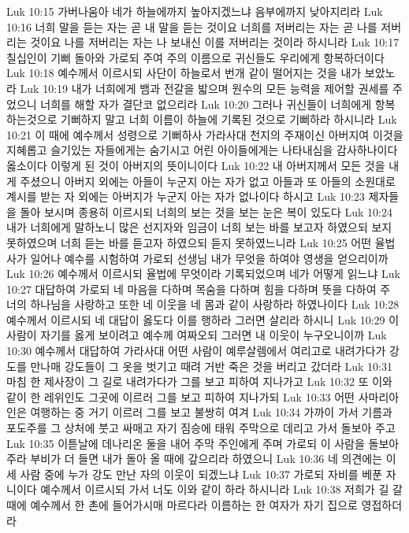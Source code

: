 Luk 10:15  가버나움아 네가 하늘에까지 높아지겠느냐 음부에까지 낮아지리라
Luk 10:16  너희 말을 듣는 자는 곧 내 말을 듣는 것이요 너희를 저버리는 자는 곧 나를 저버리는 것이요 나를 저버리는 자는 나 보내신 이를 저버리는 것이라 하시니라
Luk 10:17  칠십인이 기뻐 돌아와 가로되 주여 주의 이름으로 귀신들도 우리에게 항복하더이다
Luk 10:18  예수께서 이르시되 사단이 하늘로서 번개 같이 떨어지는 것을 내가 보았노라
Luk 10:19  내가 너희에게 뱀과 전갈을 밟으며 원수의 모든 능력을 제어할 권세를 주었으니 너희를 해할 자가 결단코 없으리라
Luk 10:20  그러나 귀신들이 너희에게 항복하는것으로 기뻐하지 말고 너희 이름이 하늘에 기록된 것으로 기뻐하라 하시니라
Luk 10:21  이 때에 예수께서 성령으로 기뻐하사 가라사대 천지의 주재이신 아버지여 이것을 지혜롭고 슬기있는 자들에게는 숨기시고 어린 아이들에게는 나타내심을 감사하나이다 옳소이다 이렇게 된 것이 아버지의 뜻이니이다
Luk 10:22  내 아버지께서 모든 것을 내게 주셨으니 아버지 외에는 아들이 누군지 아는 자가 없고 아들과 또 아들의 소원대로 계시를 받는 자 외에는 아버지가 누군지 아는 자가 없나이다 하시고
Luk 10:23  제자들을 돌아 보시며 종용히 이르시되 너희의 보는 것을 보는 눈은 복이 있도다
Luk 10:24  내가 너희에게 말하노니 많은 선지자와 임금이 너희 보는 바를 보고자 하였으되 보지 못하였으며 너희 듣는 바를 듣고자 하였으되 듣지 못하였느니라
Luk 10:25  어떤 율법사가 일어나 예수를 시험하여 가로되 선생님 내가 무엇을 하여야 영생을 얻으리이까
Luk 10:26  예수께서 이르시되 율법에 무엇이라 기록되었으며 네가 어떻게 읽느냐
Luk 10:27  대답하여 가로되 네 마음을 다하며 목숨을 다하며 힘을 다하며 뜻을 다하여 주 너의 하나님을 사랑하고 또한 네 이웃을 네 몸과 같이 사랑하라 하였나이다
Luk 10:28  예수께서 이르시되 네 대답이 옳도다 이를 행하라 그러면 살리라 하시니
Luk 10:29  이 사람이 자기를 옳게 보이려고 예수께 여짜오되 그러면 내 이웃이 누구오니이까
Luk 10:30  예수께서 대답하여 가라사대 어떤 사람이 예루살렘에서 여리고로 내려가다가 강도를 만나매 강도들이 그 옷을 벗기고 때려 거반 죽은 것을 버리고 갔더라
Luk 10:31  마침 한 제사장이 그 길로 내려가다가 그를 보고 피하여 지나가고
Luk 10:32  또 이와 같이 한 레위인도 그곳에 이르러 그를 보고 피하여 지나가되
Luk 10:33  어떤 사마리아인은 여행하는 중 거기 이르러 그를 보고 불쌍히 여겨
Luk 10:34  가까이 가서 기름과 포도주를 그 상처에 붓고 싸매고 자기 짐승에 태워 주막으로 데리고 가서 돌보아 주고
Luk 10:35  이튿날에 데나리온 둘을 내어 주막 주인에게 주며 가로되 이 사람을 돌보아 주라 부비가 더 들면 내가 돌아 올 때에 갚으리라 하였으니
Luk 10:36  네 의견에는 이 세 사람 중에 누가 강도 만난 자의 이웃이 되겠느냐
Luk 10:37  가로되 자비를 베푼 자니이다 예수께서 이르시되 가서 너도 이와 같이 하라 하시니라
Luk 10:38  저희가 길 갈 때에 예수께서 한 촌에 들어가시매 마르다라 이름하는 한 여자가 자기 집으로 영접하더라

